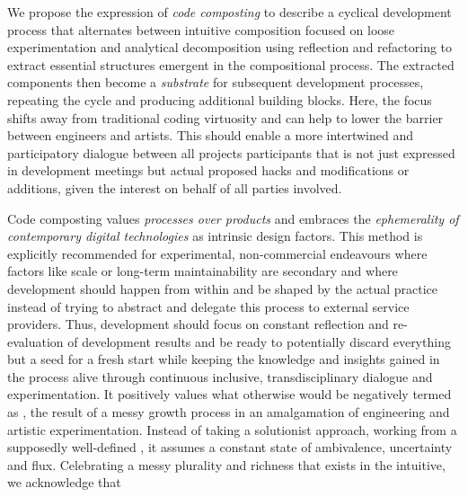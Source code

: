 We propose the expression of \emph{code composting} to describe a cyclical development process that alternates between intuitive composition focused on loose experimentation and analytical decomposition using reflection and refactoring to extract essential structures emergent in the compositional process.
The extracted components then become a \emph{substrate} for subsequent development processes, repeating the cycle and producing additional building blocks.
Here, the focus shifts away from traditional coding virtuosity and can help to lower the barrier between engineers and artists.
This should enable a more intertwined and participatory dialogue between all project\textquotesingle s participants that is not just expressed in development meetings but actual proposed hacks and modifications or additions, given the interest on behalf of all parties involved.

Code composting values \emph{processes over products} and embraces the \emph{ephemerality of contemporary digital technologies} as intrinsic design factors.
This method is explicitly recommended for experimental, non-commercial endeavours where factors like scale or long-term maintainability are secondary and where development should happen from within and be shaped by the actual practice instead of trying to abstract and delegate this process to external service providers.
Thus, development should focus on constant reflection and re-evaluation of development results and be ready to potentially discard everything but a seed for a fresh start while keeping the knowledge and insights gained in the process alive through continuous inclusive, transdisciplinary dialogue and experimentation.
It positively values what otherwise would be negatively termed as , the result of a messy growth process in an amalgamation of engineering and artistic experimentation.
Instead of taking a solutionist approach, working from a supposedly well-defined , it assumes a constant state of ambivalence, uncertainty and flux.
Celebrating a messy plurality and richness that exists in the intuitive, we acknowledge that \parencite[][55]{harawayStayingWithTheTrouble}
